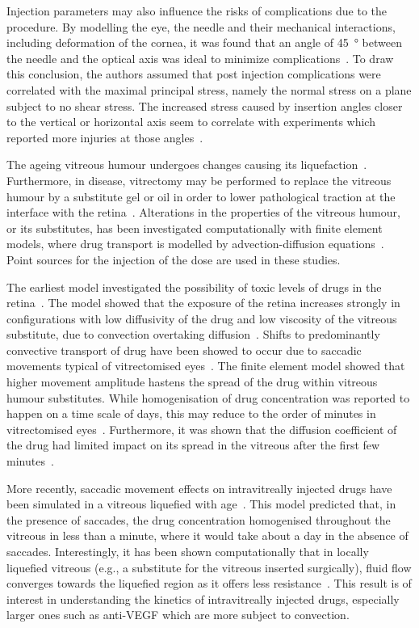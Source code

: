 \documentclass{article}
\begin{document}
Injection parameters may also influence the risks of complications due to the procedure.
By modelling the eye, the needle and their mechanical interactions, including deformation of the cornea, it was found that an angle of \SI{45}{\degree} between the needle and the optical axis was ideal to minimize complications~\cite{Karimi_2018}.
To draw this conclusion, the authors assumed that post injection complications were correlated with the maximal principal stress, namely the normal stress on a plane subject to no shear stress.  
The increased stress caused by insertion angles closer to the vertical or horizontal axis seem to correlate with experiments which reported more injuries at those angles~\cite{Karimi_2018}.

The ageing vitreous humour undergoes changes causing its liquefaction~\cite{Los_2003}.
Furthermore, in disease, vitrectomy may be performed to replace the vitreous humour by a substitute gel or oil in order to lower pathological traction at the interface with the retina~\cite{Dervenis_2022}.
Alterations in the properties of the vitreous humour, or its substitutes, has been investigated computationally with finite element models, where drug transport is modelled by advection-diffusion equations~\cite{Kathawate_2008,Modareszadeh_2012}.
Point sources for the injection of the dose are used in these studies.

The earliest model investigated the possibility of toxic levels of drugs in the retina~\cite{Kathawate_2008}.
The model showed that the exposure of the retina increases strongly in configurations with low diffusivity of the drug and low viscosity of the vitreous substitute, due to convection overtaking diffusion~\cite{Kathawate_2008}.
Shifts to predominantly convective transport of drug have been showed to occur due to saccadic movements typical of vitrectomised eyes~\cite{Modareszadeh_2012}.
The finite element model showed that higher movement amplitude hastens the spread of the drug within vitreous humour substitutes.
While homogenisation of drug concentration was reported to happen on a time scale of days, this may reduce to the order of minutes in vitrectomised eyes~\cite{Modareszadeh_2012}.
Furthermore, it was shown that the diffusion coefficient of the drug had limited impact on its spread in the vitreous after the first few minutes~\cite{Modareszadeh_2012}.

More recently, saccadic movement effects on intravitreally injected drugs have been simulated in a vitreous liquefied with age~\cite{Ferroni_2020}.
This model predicted that, in the presence of saccades, the drug concentration homogenised throughout the vitreous in less than a minute, where it would take about a day in the absence of saccades.
Interestingly, it has been shown computationally that in locally liquefied vitreous (e.g., a substitute for the vitreous inserted surgically), fluid flow converges towards the liquefied region as it offers less resistance~\cite{Khoobyar_2022}.
This result is of interest in understanding the kinetics of intravitreally injected drugs, especially larger ones such as anti-VEGF which are more subject to convection.
\end{document}
